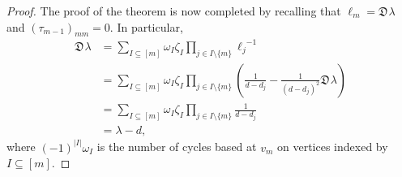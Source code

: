 \documentclass[10pt,a4paper]{amsart}
\newcommand{\zdu}{\mathfrak{D}\mspace{1mu}}
\begin{document}
\begin{proof}
The proof of the theorem is now completed by recalling that $\ell_m=\zdu \lambda$ and $(\tau_{m-1})_{mm}=0$.   In particular, 
\begin{align*}
\zdu\lambda&=\sum_{I\subseteq [m]}\omega_I\zeta_I\prod_{j\in I\setminus\{m\}}{\ell_j}^{-1}\\
&=\sum_{I\subseteq [m]}\omega_I\zeta_{I}\prod_{j\in I\setminus\{m\}}\left(\frac{1}{d-d_j}-\frac{1}{(d-d_j)^2}\zdu\lambda\right)\\
&=\sum_{I\subseteq [m]}\omega_I\zeta_{I}\prod_{j\in I\setminus\{m\}}\frac{1}{d-d_j}\\
&=\lambda-d,
\end{align*}
where $(-1)^{|I|}\omega_I$ is the number of cycles based at $v_m$ on vertices indexed by $I\subseteq [m]$.  

\end{proof}
\end{document}

